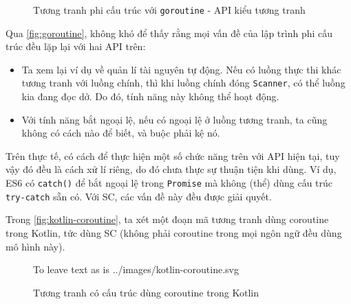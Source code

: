 \documentclass[../../thesis]{subfiles}
\begin{document}
\begin{figure}
    \centering
    
    \vspace*{-10mm}
    \caption{Tương tranh phi cấu trúc với \texttt{goroutine} - API kiểu tương
        tranh \cite{NJS_SC}}
    \label{fig:goroutine}
\end{figure}

Qua \autoref{fig:goroutine}, không khó để thấy rằng mọi vấn đề của lập trình phi
cấu trúc đều lặp lại với hai API trên:

\begin{itemize}
    \item
        Ta xem lại ví dụ về quản lí tài nguyên tự động. Nếu có luồng thực thi
        khác tương tranh với luồng chính, thì khi luồng chính đóng
        \texttt{Scanner}, có thể luồng kia đang đọc dở. Do đó, tính năng này
        không thể hoạt động.
\end{itemize}

\begin{itemize}[resume, before = \vspace*{-\dimexpr\topsep+\partopsep\relax}]
    \item
        Với tính năng bắt ngoại lệ, nếu có ngoại lệ ở luồng tương tranh, ta cũng
        không có cách nào để biết, và buộc phải kệ nó.
\end{itemize}

Trên thực tế, có cách để thực hiện một số chức năng trên với API hiện tại, tuy
vậy đó đều là cách xử lí riêng, do đó chưa thực sự thuận tiện khi dùng. Ví dụ,
ES6 có \texttt{catch()} để bắt ngoại lệ trong \texttt{Promise} mà không (thể)
dùng cấu trúc \texttt{try-catch} sẵn có. Với SC, các vấn đề này đều được giải
quyết.

Trong \autoref{fig:kotlin-coroutine}, ta xét một đoạn mã tương tranh dùng
coroutine trong Kotlin, tức dùng SC (không phải coroutine trong mọi ngôn ngữ đều
dùng mô hình này).

\begin{figure}
    \centering
     To leave text as is
        {../images/kotlin-coroutine.svg}                 %
    \vspace*{-10mm}
    \caption{Tương tranh có cấu trúc dùng coroutine trong Kotlin \cite{NJS_SC}}
    \label{fig:kotlin-coroutine}
\end{figure}
\end{document}
